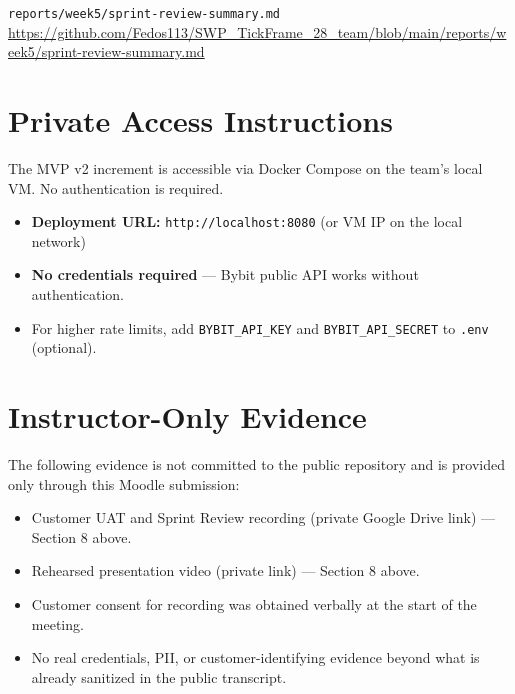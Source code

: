 \documentclass[11pt,a4paper]{article}
\begin{document}
\texttt{reports/week5/sprint-review-summary.md} \\
\url{https://github.com/Fedos113/SWP_TickFrame_28_team/blob/main/reports/week5/sprint-review-summary.md}

\section{Private Access Instructions}

The MVP v2 increment is accessible via Docker Compose on the team's local VM. No authentication is required.

\begin{itemize}
    \item \textbf{Deployment URL:} \texttt{http://localhost:8080} (or VM IP on the local network)
    \item \textbf{No credentials required} --- Bybit public API works without authentication.
    \item For higher rate limits, add \texttt{BYBIT\_API\_KEY} and \texttt{BYBIT\_API\_SECRET} to \texttt{.env} (optional).
\end{itemize}

\section{Instructor-Only Evidence}

The following evidence is not committed to the public repository and is provided only through this Moodle submission:
\begin{itemize}
    \item Customer UAT and Sprint Review recording (private Google Drive link) --- Section 8 above.
    \item Rehearsed presentation video (private link) --- Section 8 above.
    \item Customer consent for recording was obtained verbally at the start of the meeting.
    \item No real credentials, PII, or customer-identifying evidence beyond what is already sanitized in the public transcript.
\end{itemize}
\end{document}
